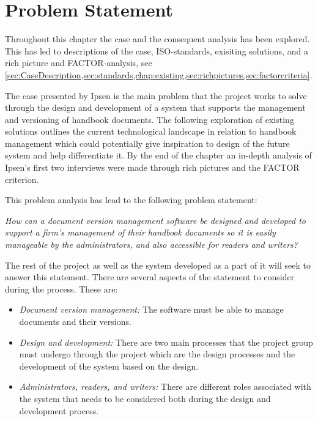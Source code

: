 \section{Problem Statement} \label{problemstatement}
Throughout this chapter the case and the consequent analysis has been explored.
This has led to descriptions of the case, ISO-standards, exisiting solutions, and a rich picture and FACTOR-analysis, see \cref{sec:CaseDescription,sec:standards,chap:existing,sec:richpictures,sec:factorcriteria}.

The case presented by Ipsen is the main problem that the project works to solve through the design and development of a system that supports the management and versioning of handbook documents. 
The following exploration of existing solutions outlines the current technological landscape in relation to handbook management which could potentially give inspiration to design of the future system and help differentiate it.
By the end of the chapter an in-depth analysis of Ipsen's first two interviews were made through rich pictures and the FACTOR criterion.

This problem analysis has lead to the following problem statement:

\begin{center}
\textit{How can a document version management software be designed and developed to support a firm's management of their handbook documents so it is easily manageable by the administrators, and also accessible for readers and writers?}
\end{center}

The rest of the project as well as  the system developed as a part of it will seek to answer this statement.
There are several aspects of the statement to consider during the process.
These are:
\begin{itemize}
	\item 
		\textit{Document version management:} 
		The software must be able to manage documents and their versions.
	\item 
		\textit{Design and development:} 
		There are two main processes that the project group must undergo through the project which are the design processes and the development of the system based on the design.
	\item 
		\textit{Administrators, readers, and writers:} 
		There are different roles associated with the system that needs to be considered both during the design and development process.
\end{itemize}
